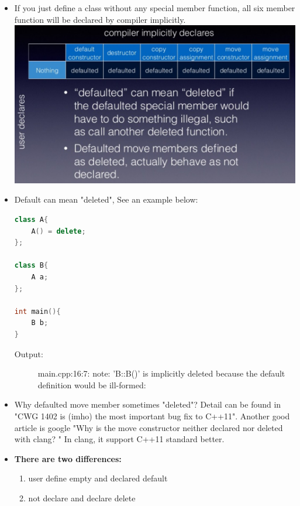 \documentclass[a4paper,11pt,twoside]{book}
\begin{document}
\begin{itemize}
\item If you just define a class without any special member function, all six member function will be declared by compiler implicitly. \\
\includegraphics[scale=0.6]{pics/sm2.png} \newline


\item Default can mean "deleted", See an example below:

\begin{lstlisting}[frame=single, language=c++]
class A{
	A() = delete;
};

class B{
	A a;
};

int main(){
	B b;
}
\end{lstlisting}
\begin{description}
	\item[Output:] main.cpp:16:7: note: 'B::B()' is implicitly deleted because the default definition would be ill-formed:
\end{description}

\item Why defaulted move member sometimes "deleted"? Detail can be found in "CWG 1402 is (imho) the most important bug fix to C++11". Another good article is google "Why is the move constructor neither declared nor deleted with clang? " In clang, it support C++11 standard better. 

\item \textbf{There are two differences:}
\begin{enumerate}
	\item user define empty and declared default
	\item not declare and declare delete
\end{enumerate}


\end{itemize}
\end{document}
